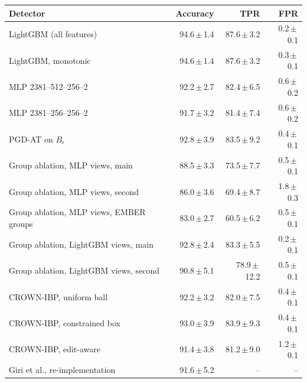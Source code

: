\begin{tabular}{lrrr}
\toprule
Detector & Accuracy & TPR & FPR \\
\midrule
LightGBM (all features) & 94.6\,$\pm$\,1.4 & 87.6\,$\pm$\,3.2 & 0.2\,$\pm$\,0.1 \\
LightGBM, monotonic & 94.6\,$\pm$\,1.4 & 87.6\,$\pm$\,3.2 & 0.3\,$\pm$\,0.1 \\
MLP 2381--512--256--2 & 92.2\,$\pm$\,2.7 & 82.4\,$\pm$\,6.5 & 0.6\,$\pm$\,0.2 \\
MLP 2381--256--256--2 & 91.7\,$\pm$\,3.2 & 81.4\,$\pm$\,7.4 & 0.6\,$\pm$\,0.2 \\
PGD-AT on $B_\epsilon$ & 92.8\,$\pm$\,3.9 & 83.5\,$\pm$\,9.2 & 0.4\,$\pm$\,0.1 \\
Group ablation, MLP views, main & 88.5\,$\pm$\,3.3 & 73.5\,$\pm$\,7.7 & 0.5\,$\pm$\,0.1 \\
Group ablation, MLP views, second & 86.0\,$\pm$\,3.6 & 69.4\,$\pm$\,8.7 & 1.8\,$\pm$\,0.3 \\
Group ablation, MLP views, EMBER groups & 83.0\,$\pm$\,2.7 & 60.5\,$\pm$\,6.2 & 0.5\,$\pm$\,0.1 \\
Group ablation, LightGBM views, main & 92.8\,$\pm$\,2.4 & 83.3\,$\pm$\,5.5 & 0.2\,$\pm$\,0.1 \\
Group ablation, LightGBM views, second & 90.8\,$\pm$\,5.1 & 78.9\,$\pm$\,12.2 & 0.5\,$\pm$\,0.1 \\
CROWN-IBP, uniform ball & 92.2\,$\pm$\,3.2 & 82.0\,$\pm$\,7.5 & 0.4\,$\pm$\,0.1 \\
CROWN-IBP, constrained box & 93.0\,$\pm$\,3.9 & 83.9\,$\pm$\,9.3 & 0.4\,$\pm$\,0.1 \\
CROWN-IBP, edit-aware & 91.4\,$\pm$\,3.8 & 81.2\,$\pm$\,9.0 & 1.2\,$\pm$\,0.1 \\
Giri et al., re-implementation & 91.6\,$\pm$\,5.2 & -- & -- \\
\bottomrule
\end{tabular}
